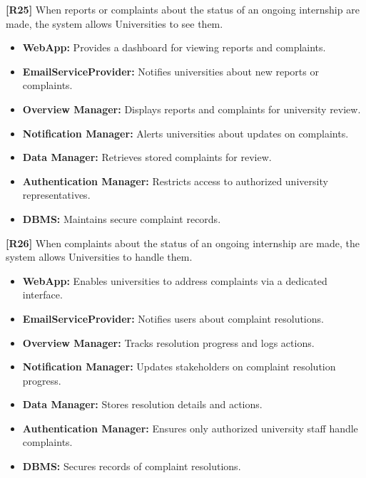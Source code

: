 \textbf{[R25]} When reports or complaints about the status of an ongoing internship are made, the system allows Universities to see them.  
\begin{itemize}
    \item \textbf{WebApp:} Provides a dashboard for viewing reports and complaints.  
    \item \textbf{EmailServiceProvider:} Notifies universities about new reports or complaints.  
    \item \textbf{Overview Manager:} Displays reports and complaints for university review.  
    \item \textbf{Notification Manager:} Alerts universities about updates on complaints.  
    \item \textbf{Data Manager:} Retrieves stored complaints for review.  
    \item \textbf{Authentication Manager:} Restricts access to authorized university representatives.  
    \item \textbf{DBMS:} Maintains secure complaint records.  
\end{itemize}  

\textbf{[R26]} When complaints about the status of an ongoing internship are made, the system allows Universities to handle them.  
\begin{itemize}
    \item \textbf{WebApp:} Enables universities to address complaints via a dedicated interface.  
    \item \textbf{EmailServiceProvider:} Notifies users about complaint resolutions.  
    \item \textbf{Overview Manager:} Tracks resolution progress and logs actions.  
    \item \textbf{Notification Manager:} Updates stakeholders on complaint resolution progress.  
    \item \textbf{Data Manager:} Stores resolution details and actions.  
    \item \textbf{Authentication Manager:} Ensures only authorized university staff handle complaints.  
    \item \textbf{DBMS:} Secures records of complaint resolutions.  
\end{itemize}  
